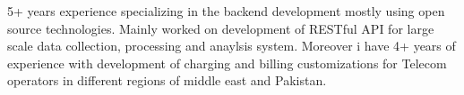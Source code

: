 

\begin{cvparagraph}

5+ years experience specializing in the backend development mostly using open source technologies. Mainly worked on development of RESTful API for large scale data collection,
processing and anaylsis system. Moreover i have 4+ years of experience with development of charging and billing customizations for Telecom operators in different regions of middle east and Pakistan.

 \end{cvparagraph}
